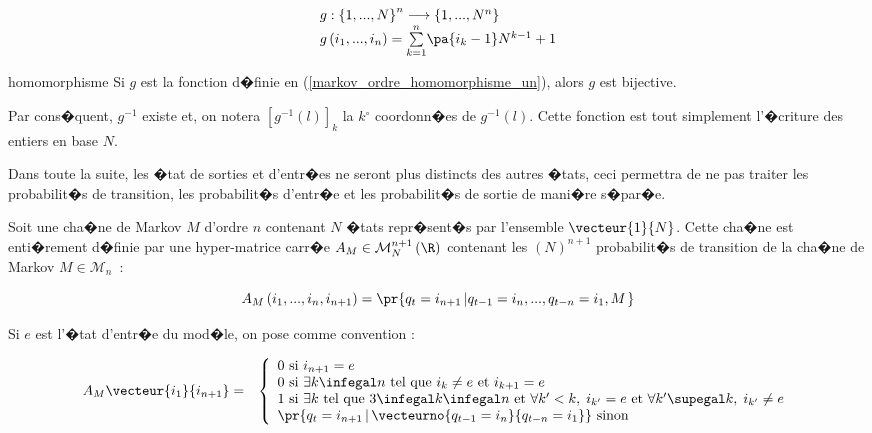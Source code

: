         \begin{eqnarray}
        \begin{array}{l}
        g:\left\{  1,...,N\right\}  ^{n}\longrightarrow\left\{  1,...,N^{n}\right\}\\
        g\left(  i_{1},...,i_{n}\right)  =\underset{k=1}{\overset{n}{\sum}}\pa{i_{k}-1}N^{k-1}+1
        \end{array}
        \label{markov_ordre_homomorphisme_un}
        \end{eqnarray}

        \begin{xproperty}{homomorphisme}
        \label{propriete_chaine_ordre_n_1}%
        Si $g$ est la fonction d�finie en (\ref{markov_ordre_homomorphisme_un}), alors $g$ est bijective.
        \end{xproperty}


Par cons�quent, $g^{-1}$ existe et, on notera $\left[g^{-1}\left(l\right)\right]  _{k}$ la $k{{}^\circ}$ coordonn�es de $g^{-1}\left(l\right)$. Cette fonction est tout simplement l'�criture des entiers en base $N$.

Dans toute la suite, les �tat de sorties et d'entr�es ne seront plus distincts des autres �tats, ceci permettra de ne pas traiter les probabilit�s de transition, les probabilit�s d'entr�e et les probabilit�s de sortie de mani�re s�par�e.


Soit une cha�ne de Markov $M$ d'ordre $n$ contenant $N$ �tats repr�sent�s par l'ensemble $\vecteur{1}{N}$. Cette cha�ne est enti�rement d�finie par une hyper-matrice carr�e $A_{M}\in\mathcal{M}_{N}^{n+1}\left(\R\right)  $ contenant les $\left( N\right)^{n+1}$ probabilit�s de transition de la cha�ne de Markov $M\in\mathcal{M}_{n}$~:

        $$
        A_{M}\left(i_{1},...,i_{n},i_{n+1}\right)  =\pr{  q_{t}=i_{n+1}\left| 
         q_{t-1}=i_{n},...,q_{t-n}=i_{1},M\right.  }
        $$

Si $e$ est l'�tat d'entr�e du mod�le, on pose comme convention :

        \begin{eqnarray}
        A_M \vecteur{i_1}{i_{n+1}} &=& \left \{
        \begin{array}{l}
        0 \text{ si } i_{n+1} = e \\
        0 \text{ si } \exists k \infegal n \text{ tel que } i_k \neq e \text{ et } i_{k+1} = e \\
        1 \text{ si } \exists k \text{ tel que }  3 \infegal k \infegal n \text{ et } \forall k' < k, \; i_{k'} =
                 e \text { et } \forall k' \supegal k, \; i_{k'} \neq e \\
        \pr{q_t = i_{n+1} \, | \, \vecteurno{q_{t-1} = i_n}{q_{t-n} = i_1}} \text{ sinon}
        \end{array}
        \right. \label{hmm_equation_convention_ordre}
        \end{eqnarray}

